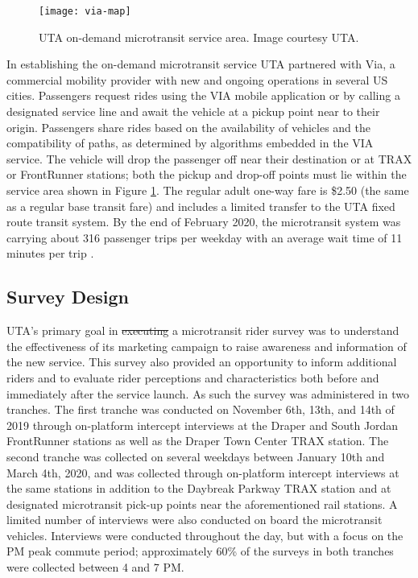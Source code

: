 \documentclass[smartcities,article,submit,moreauthors,pdftex]{Definitions/mdpi}
\providecommand{\DIFadd}[1]{{\protect\color{blue}\uwave{#1}}} %
\providecommand{\DIFdel}[1]{{\protect\color{red}\sout{#1}}}                      %
\providecommand{\DIFaddbegin}{} %
\providecommand{\DIFaddend}{} %
\providecommand{\DIFdelbegin}{} %
\providecommand{\DIFdelend}{} %
\begin{document}
\begin{figure}
    \centering
    \texttt{[image: via-map]}
    \caption{UTA on-demand microtransit service area. Image courtesy UTA.}
    \label{fig:via-map}
\end{figure}

In establishing the on-demand microtransit service UTA partnered with Via, a commercial mobility provider with new and ongoing operations in several US cities. Passengers request rides using the VIA mobile application or by calling a designated service line and await the vehicle at a pickup point near to their origin. Passengers share rides based on the availability of vehicles and the compatibility of paths, as determined by algorithms embedded in the VIA service. The vehicle will drop the passenger off near their destination or at TRAX or FrontRunner stations; both the pickup and drop-off points must lie within the service area shown in Figure \ref{fig:via-map}. The regular adult one-way fare is \$2.50 (the same as a regular base transit fare) and includes a limited transfer to the UTA fixed route transit system. By the end of February 2020, the microtransit system was carrying about 316 passenger trips per weekday with an average wait time of 11 minutes per trip \citep{uta2020}.



\subsection{Survey Design}
UTA’s primary goal in \DIFdelbegin \DIFdel{executing }\DIFdelend \DIFaddbegin \DIFadd{collecting }\DIFaddend a microtransit rider survey was to understand the effectiveness of its marketing campaign to raise awareness and information of the new service. This survey also provided an opportunity to inform additional riders and to evaluate rider perceptions and characteristics both before and immediately after the service launch. As such the survey was administered in two tranches. The first tranche was conducted on November 6th, 13th, and 14th of 2019 through on-platform intercept interviews at the Draper and South Jordan FrontRunner stations as well as the Draper Town Center TRAX station. The second tranche was collected on several weekdays between January 10th and March 4th, 2020, and was collected through on-platform intercept interviews at the same stations in addition to the Daybreak Parkway TRAX station and at designated microtransit pick-up points near the aforementioned rail stations. A limited number of interviews were also conducted on board the microtransit vehicles. Interviews were conducted throughout the day, but with a focus on the PM peak commute period; approximately 60\% of the surveys in both tranches were collected between 4 and 7 PM.
\end{document}
